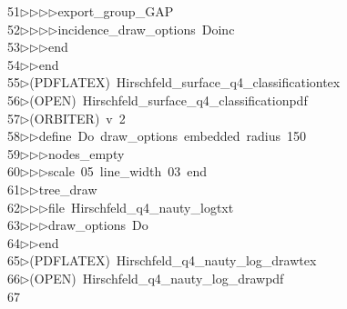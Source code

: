 \begin{tabbing}
51\>$\triangleright$\>$\triangleright$\>$\triangleright$\>$\triangleright$\>export\_group\_GAP\ \\[0pt]
52\>$\triangleright$\>$\triangleright$\>$\triangleright$\>$\triangleright$\>incidence\_draw\_options\ Doinc\ \\[0pt]
53\>$\triangleright$\>$\triangleright$\>$\triangleright$\>end\ \\[0pt]
54\>$\triangleright$\>$\triangleright$\>end\\[0pt]
55\>$\triangleright$\>(PDFLATEX)\ Hirschfeld\_surface\_q4\_classificationtex\\[0pt]
56\>$\triangleright$\>(OPEN)\ Hirschfeld\_surface\_q4\_classificationpdf\\[0pt]
57\>$\triangleright$\>(ORBITER)\ v\ 2\ \\[0pt]
58\>$\triangleright$\>$\triangleright$\>define\ Do\ draw\_options\ embedded\ radius\ 150\ \\[0pt]
59\>$\triangleright$\>$\triangleright$\>$\triangleright$\>nodes\_empty\ \\[0pt]
60\>$\triangleright$\>$\triangleright$\>$\triangleright$\>scale\ 05\ line\_width\ 03\ end\ \\[0pt]
61\>$\triangleright$\>$\triangleright$\>tree\_draw\ \\[0pt]
62\>$\triangleright$\>$\triangleright$\>$\triangleright$\>file\ Hirschfeld\_q4\_nauty\_logtxt\ \\[0pt]
63\>$\triangleright$\>$\triangleright$\>$\triangleright$\>draw\_options\ Do\ \\[0pt]
64\>$\triangleright$\>$\triangleright$\>end\\[0pt]
65\>$\triangleright$\>(PDFLATEX)\ Hirschfeld\_q4\_nauty\_log\_drawtex\\[0pt]
66\>$\triangleright$\>(OPEN)\ Hirschfeld\_q4\_nauty\_log\_drawpdf\\[0pt]
67\>\end{tabbing}
